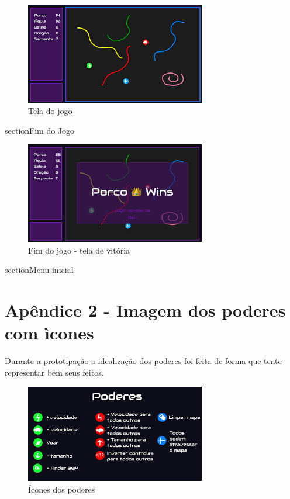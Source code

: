 \begin{apendicesenv}
\begin{figure}[htbp]
    \centering
    \caption{Tela do jogo}
    \label{fig:prototipo-in-game}
    \includegraphics[width=0.7\textwidth]{figuras/prototipo-in-game.png}
\end{figure}

section{Fim do Jogo}

\begin{figure}[htbp]
    \centering
    \caption{Fim do jogo - tela de vitória}
    \label{fig:prototipo-end-game}
    \includegraphics[width=0.7\textwidth]{figuras/prototipo-end-game.png}
\end{figure}

section{Menu inicial}

\chapter{Apêndice 2 - Imagem dos poderes com ìcones}

Durante a prototipação a idealização dos poderes foi feita de forma que tente representar bem seus feitos. 

\begin{figure}[htbp]
    \centering
    \caption{Ícones dos poderes}
    \label{fig:prototipo-poderes}
    \includegraphics[width=0.7\textwidth]{figuras/prototipo-poderes.png}
\end{figure}


\end{apendicesenv}
